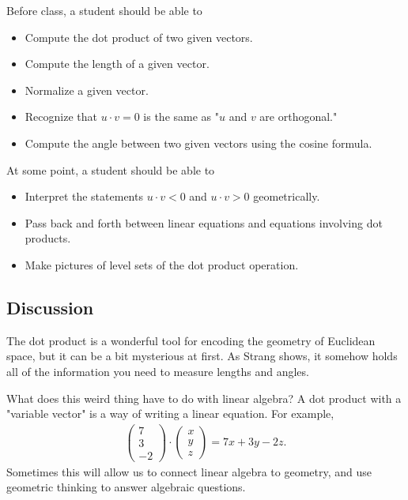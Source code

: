 \documentclass[10pt,]{book}
\theoremstyle{plain}
\numberwithin{equation}{section}
\begin{document}
      Before class, a student should be able to
      \begin{itemize}
\item{}Compute the dot product of two given vectors.\item{}Compute the length of a given vector.\item{}Normalize a given vector.\item{}Recognize that \(u \cdot v =0\) is the same as "\(u\) and \(
            v\) are orthogonal."\item{}
          Compute the angle between two given vectors using the cosine formula.
        \end{itemize}

      At some point, a student should be able to
      \begin{itemize}
\item{}
          Interpret the statements \(u\cdot v < 0 \) and \(u \cdot v > 0\)
          geometrically.
        \item{}Pass back and forth between linear equations and equations involving
          dot products.
        \item{}Make pictures of level sets of the dot product operation.\end{itemize}

\typeout{************************************************}
\typeout{************************************************}
\subsection[Discussion]{Discussion}\label{subsection-7}

      The dot product is a wonderful tool for encoding the geometry of Euclidean
      space, but it can be a bit mysterious at first. As Strang shows,
      it somehow holds all of the information you need to measure lengths and
      angles.
\par

      What does this weird thing have to do with linear algebra? A dot product
      with a "variable vector" is a way of writing a linear equation. For example,
      \begin{gather*}
\begin{pmatrix} 7 \\ 3 \\ -2 \end{pmatrix} \cdot \begin{pmatrix}
        x \\ y \\ z \end{pmatrix} = 7x+3y-2z.
\end{gather*}
      Sometimes this will allow us to connect linear algebra to geometry, and use
      geometric thinking to answer algebraic questions.
\typeout{************************************************}
\typeout{************************************************}
\end{document}
